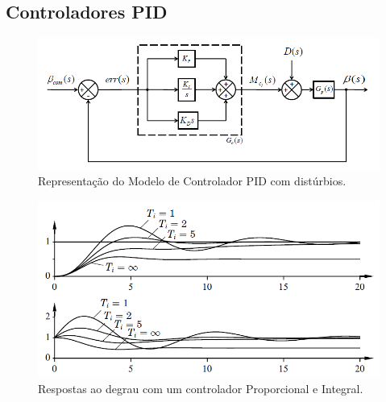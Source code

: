 \subsection{Controladores PID}

\begin{figure}[htb]
  \caption{Representação do Modelo de Controlador PID com distúrbios.}
  \begin{center}
      \includegraphics[scale=0.75]{img/pid_controller_Snider_p35}
  \end{center}
  \label{fig:pid_controller_Snider_p35}
\end{figure}

\begin{figure}[htb]
  \caption{Respostas ao degrau com um controlador Proporcional e Integral.}
  \begin{center}
      \includegraphics[scale=0.75]{img/pi_astrom_p68}
  \end{center}
  \label{fig:pi_astrom_p68}
\end{figure}

